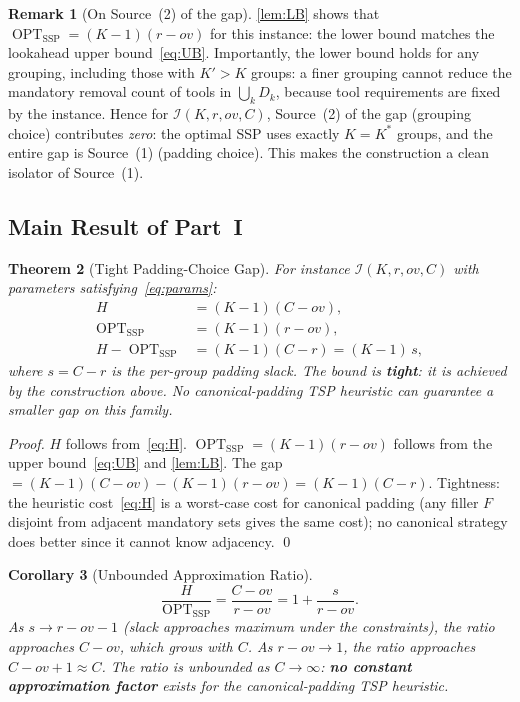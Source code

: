 \documentclass[11pt,a4paper]{article}
\theoremstyle{plain}
\newtheorem{theorem}{Theorem}[section]
\newtheorem{corollary}[theorem]{Corollary}
\theoremstyle{definition}
\newtheorem{remark}[theorem]{Remark}
\DeclareMathOperator{\OPT}{OPT}
\newcommand{\Kstar}{K^{*}}
\begin{document}
\begin{remark}[On Source~(2) of the gap]
\label{rem:source2}
\cref{lem:LB} shows that $\OPT_{\mathrm{SSP}}=(K-1)(r-\mathit{ov})$ for this
instance: the lower bound matches the lookahead upper bound~\eqref{eq:UB}.
Importantly, the lower bound holds for any grouping, including those with $K'>K$
groups: a finer grouping cannot reduce the mandatory removal count of tools in
$\bigcup_k D_k$, because tool requirements are fixed by the instance.
Hence for $\mathcal{I}(K,r,\mathit{ov},C)$, Source~(2) of the gap
(grouping choice) contributes \emph{zero}: the optimal SSP uses exactly $K=\Kstar$
groups, and the entire gap is Source~(1) (padding choice).
This makes the construction a clean isolator of Source~(1).
\end{remark}

\subsection{Main Result of Part~I}

\begin{thmbox}
\begin{theorem}[Tight Padding-Choice Gap]
\label{thm:gap}
For instance $\mathcal{I}(K,r,\mathit{ov},C)$ with parameters satisfying~\eqref{eq:params}:
\begin{align*}
  H &= (K-1)(C-\mathit{ov}), \\
  \OPT_{\mathrm{SSP}} &= (K-1)(r-\mathit{ov}), \\
  H - \OPT_{\mathrm{SSP}} &= (K-1)(C-r) = (K-1)\,s,
\end{align*}
where $s=C-r$ is the per-group padding slack.
The bound is \textbf{tight}: it is achieved by the construction above.
No canonical-padding TSP heuristic can guarantee a smaller gap on this family.
\end{theorem}
\end{thmbox}

\begin{proof}
$H$ follows from~\eqref{eq:H}. $\OPT_{\mathrm{SSP}}=(K-1)(r-\mathit{ov})$
follows from the upper bound~\eqref{eq:UB} and \cref{lem:LB}.
The gap $=(K-1)(C-\mathit{ov})-(K-1)(r-\mathit{ov})=(K-1)(C-r)$.
Tightness: the heuristic cost~\eqref{eq:H} is a worst-case cost for canonical padding
(any filler $F$ disjoint from adjacent mandatory sets gives the same cost);
no canonical strategy does better since it cannot know adjacency. \qed
\end{proof}

\begin{corollary}[Unbounded Approximation Ratio]
\label{cor:ratio}
\[
  \frac{H}{\OPT_{\mathrm{SSP}}}=\frac{C-\mathit{ov}}{r-\mathit{ov}}=1+\frac{s}{r-\mathit{ov}}.
\]
As $s\to r-\mathit{ov}-1$ (slack approaches maximum under the constraints), the ratio
approaches $C-\mathit{ov}$, which grows with $C$.
As $r-\mathit{ov}\to 1$, the ratio approaches $C-\mathit{ov}+1\approx C$.
The ratio is unbounded as $C\to\infty$: \textbf{no constant approximation factor}
exists for the canonical-padding TSP heuristic.
\end{corollary}
\end{document}
